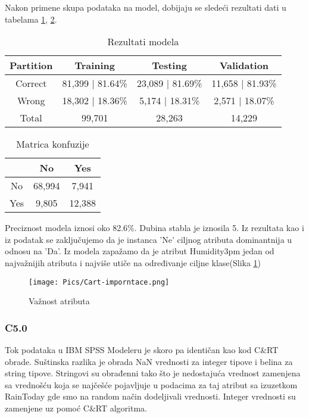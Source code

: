 \documentclass[a4paper]{article}
\begin{document}
Nakon primene skupa podataka na model, dobijaju se sledeći rezultati dati u tabelama \ref{tab:CART-res},  \ref{tab:CART-CM}.
\begin{table}[H]
        \begin{center}
        \caption{Rezultati modela}
        \label{tab:CART-res}
        \begin{tabular}{|c|c|c|c|} \hline
        \textbf{Partition} & \textbf{Training} & \textbf{Testing} &  \textbf{Validation} \\ \hline
        Correct & 81,399 | 81.64\% & 23,089 | 81.69\% & 11,658 | 81.93\% \\ \hline
        Wrong & 18,302 | 18.36\%   & 5,174 | 18.31\% & 2,571 | 18.07\% \\ \hline
        Total & 99,701  & 28,263 & 14,229 \\ \hline
        \end{tabular}
        \end{center}
\end{table}
\begin{table}[H]
        \begin{center}
        \caption{Matrica konfuzije}
        \label{tab:CART-CM}
        \begin{tabular}{|c|c|c|} \hline
        \textbf{} & \textbf{No} & \textbf{Yes} \\ \hline
        No &68,994 & 7,941  \\ \hline
        Yes &  9,805 & 12,388 \\ \hline
        \end{tabular}
        \end{center}
\end{table}
Preciznost modela iznosi oko 82.6\%. Dubina stabla je iznosila 5. Iz rezultata kao i iz podatak se zaključujemo da je instanca  'Ne'  ciljnog atributa dominantnija u odnosu na 'Da'. Iz modela zapažamo da je atribut Humidity3pm jedan od najvažnijih atributa i najviše utiče na određivanje ciljne klase(Slika \ref{fig:cart-importance})\par
\begin{figure}[H]
     \centering
     \texttt{[image: Pics/Cart-imporntace.png]}
     \caption{Važnost atributa}
     \label{fig:cart-importance}
\end{figure}

\subsubsection{C5.0}
\label{subsubsec:c50}
Tok podataka u IBM SPSS Modeleru je skoro pa identičan kao kod C\&RT obrade. Suštinska razlika je obrada NaN vrednosti za integer tipove i belina za string tipove. Stringovi su obrađenni tako što je nedostajuća vrednost zamenjena sa vrednošću koja se najčešće pojavljuje u podacima za taj atribut sa izuzetkom RainToday gde smo na random način dodeljivali vrednosti. Integer vrednosti su zamenjene uz pomoć C\&RT algoritma.\par
\end{document}
